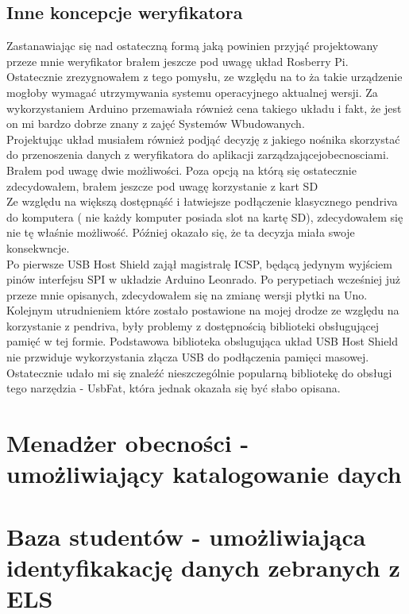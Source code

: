 \documentclass[declaration,shortabstract, mgr]{iithesis}
\begin{document}
\subsection{Inne koncepcje weryfikatora}
\indent Zastanawiając się nad ostateczną formą jaką powinien przyjąć projektowany przeze mnie weryfikator brałem jeszcze pod uwagę układ Rosberry Pi. Ostatecznie zrezygnowałem z tego pomysłu, ze względu na to ża takie urządzenie mogłoby wymagać utrzymywania systemu operacyjnego aktualnej wersji. Za wykorzystaniem Arduino przemawiała również cena takiego układu i fakt, że jest on mi bardzo dobrze znany z zajęć Systemów Wbudowanych.\\
\indent Projektując układ musiałem również podjąć decyzję z jakiego nośnika skorzystać do przenoszenia danych z weryfikatora do aplikacji zarządzającejobecnosciami. Brałem pod uwagę dwie możliwości. Poza opcją na którą się ostatecznie zdecydowałem, brałem jeszcze pod uwagę korzystanie z kart SD \\
\indent Ze względu na większą dostępnąść i łatwiejsze podłączenie klasycznego pendriva do komputera ( nie każdy komputer posiada slot na kartę SD), zdecydowałem się nie tę właśnie możliwość.  Później okazało się, że ta decyzja miała swoje konsekwncje.\\
\indent Po pierwsze USB Host Shield zajął magistralę ICSP, będącą jedynym wyjściem pinów interfejsu SPI w układzie Arduino Leonrado. Po perypetiach wcześniej już przeze mnie opisanych, zdecydowałem się na zmianę wersji płytki na Uno. \\
\indent Kolejnym utrudnieniem które zostało postawione na mojej drodze ze względu na korzystanie z pendriva, były problemy z dostępnością biblioteki obsługującej pamięć w tej formie. Podstawowa biblioteka obslugująca układ USB Host Shield nie przwiduje wykorzystania złącza USB do podłączenia pamięci masowej. \\
\indent Ostatecznie udało mi się znaleźć nieszczególnie popularną bibliotekę do obsługi tego narzędzia - UsbFat, która jednak okazała się być słabo opisana.
\section{Menadżer obecności - umożliwiający katalogowanie daych}
\section{Baza studentów - umożliwiająca identyfikakację danych zebranych z ELS}
\end{document}
